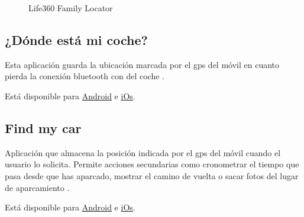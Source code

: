 \begin{figure}[h!btp]
	\begin{adjustbox}{minipage=\linewidth, fbox}
		\centering
		\hspace{10mm}
	\end{adjustbox}
\caption{Life360 Family Locator}
	\label{fig:life360}
\end{figure}

\subsection{¿Dónde está mi coche?}
Esta aplicación guarda la ubicación marcada por el gps del móvil en cuanto pierda la conexión bluetooth con del coche \cite{Unk14}.

Está disponible para \href{https://play.google.com/store/apps/details?id=com.whereismycar&hl=es}{Android} e \href{https://itunes.apple.com/es/app/donde-esta-mi-coche/id504186557?mt=8}{iOs}.

\subsection{Find my car}
Aplicación que almacena la posición indicada por el gps del móvil cuando el usuario lo solicita. Permite acciones secundarias como cronometrar el tiempo que pasa desde que has aparcado, mostrar el camino de vuelta o sacar fotos del lugar de aparcamiento \cite{Unk14}.

Está disponible para \href{https://play.google.com/store/apps/details?id=com.elibera.android.findmycar&hl=es}{Android} e \href{https://itunes.apple.com/us/app/find-my-car/id349510601?mt=8}{iOs}.

